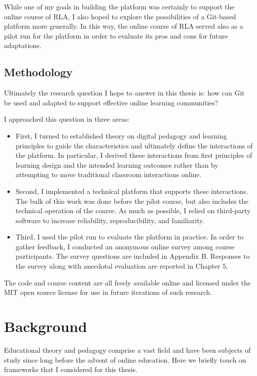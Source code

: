 \documentclass[12pt,twoside]{mitthesis}
\begin{document}
While one of my goals in building the platform was certainly to support the online course of RLA, I also hoped to explore the possibilities of a Git-based platform more generally. In this way, the online course of RLA served also as a pilot run for the platform in order to evaluate its pros and cons for future adaptations. 

\section{Methodology}

Ultimately the research question I hope to answer in this thesis is: how can Git be used and adapted to support effective online learning communities?

I approached this question in three areas:
\begin{itemize}
\item First, I turned to established theory on digital pedagogy and learning principles to guide the characteristics and ultimately define the interactions of the platform. In particular, I derived these interactions from first principles of learning design and the intended learning outcomes rather than by attempting to move traditional classroom interactions online.
\item Second, I implemented a technical platform that supports these interactions. The bulk of this work was done before the pilot course, but also includes the technical operation of the course. As much as possible, I relied on third-party software to increase reliability, reproducibility, and familiarity.
\item Third, I used the pilot run to evaluate the platform in practice. In order to gather feedback, I conducted an anonymous online survey among course participants. The survey questions are included in Appendix B. Responses to the survey along with anecdotal evaluation are reported in Chapter 5.
\end{itemize}

The code and course content are all freely available online and licensed under the MIT open source license for use in future iterations of such research.~\cite{rla}

\chapter{Background}

Educational theory and pedagogy comprise a vast field and have been subjects of study since long before the advent of online education. Here we briefly touch on frameworks that I considered for this thesis. 
\end{document}

